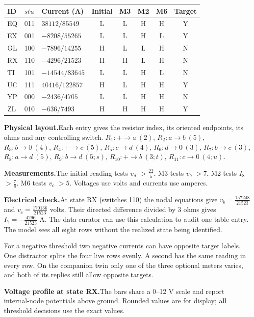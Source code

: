 \documentclass[12pt,letterpaper]{article}
\newcommand{\reading}[2]{\par\smallskip\textsf{\color{accent}\bfseries #1}\enspace #2\par}
\begin{document}
\begin{center}{\small\setlength{\tabcolsep}{4pt}\begin{tabularx}{\linewidth}{@{}llYccccc@{}}\toprule
ID & $stu$ & Current (A) & Initial & M3 & M2 & M6 & Target\\ \midrule
EQ & 011 & $38112/85549$ & L & L & H & H & Y\\
EX & 001 & $-8208/55265$ & L & L & H & L & Y\\
GL & 100 & $-7896/14255$ & H & L & L & H & N\\
RX & 110 & $-4296/21523$ & H & H & L & H & N\\
TI & 101 & $-14544/83645$ & L & L & H & L & N\\
UC & 111 & $40416/122857$ & H & L & H & H & Y\\
YP & 000 & $-2436/4705$ & L & L & H & H & N\\
ZL & 010 & $-636/7493$ & H & H & H & H & Y\\ \bottomrule\end{tabularx}}
\end{center}

\reading{Physical layout.}{Each entry gives the resistor index, its oriented endpoints, its ohms and any controlling switch. $R_{1}\colon +\to a\ (2)$, $R_{2}\colon a\to b\ (5)$, $R_{3}\colon b\to 0\ (4)$, $R_{4}\colon +\to c\ (5)$, $R_{5}\colon c\to d\ (4)$, $R_{6}\colon d\to 0\ (3)$, $R_{7}\colon b\to c\ (3)$, $R_{8}\colon a\to d\ (5)$, $R_{9}\colon b\to d\ (5;s)$, $R_{10}\colon +\to b\ (3;t)$, $R_{11}\colon c\to 0\ (4;u)$.}

\reading{Measurements.}{The initial reading tests $v_{d}$ $>\tfrac{22}{5}$. M3 tests $v_{b}$ $>7$. M2 tests $I_{8}$ $>\tfrac{7}{8}$. M6 tests $v_{c}$ $>5$. Voltages use volts and currents use amperes.}

\reading{Electrical check.}{At state RX (switches 110) the nodal equations give $v_{b}=\tfrac{157248}{21523}$ and $v_{c}=\tfrac{170136}{21523}$ volts. Their directed difference divided by $3$ ohms gives $I_{7}=-\tfrac{4296}{21523}$ A. The data curator can use this calculation to audit one table entry. The model sees all eight rows without the realized state being identified.}

For a negative threshold two negative currents can have opposite target labels. One distractor splits the four live rows evenly. A second has the same reading in every row. On the companion twin only one of the three optional meters varies, and both of its replies still allow opposite targets.
\reading{Voltage profile at state RX.}{The bars share a 0--12 V scale and report internal-node potentials above ground. Rounded values are for display; all threshold decisions use the exact values.}
\end{document}

